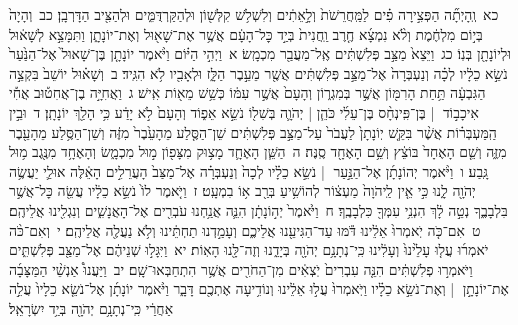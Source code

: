 \documentclass[18pt]{article}
\newcommand{\kri}[1]{\Afootnote{#1}}	%
\begin{document}
 {\loc כא~}וְֽהָיְתָ֞ה הַפְּצִ֣ירָה פִ֗ים לַמַּֽחֲרֵשֹׁת֙ וְלָ֣אֵתִ֔ים וְלִשְׁלֹ֥שׁ קִלְּשׁ֖וֹן וּלְהַקַּרְדֻּמִּ֑ים וּלְהַצִּ֖יב הַדָּרְבָֽן׃ \startlock
 {\loc כב~}וְהָיָה֙ בְּי֣וֹם מִלְחֶ֔מֶת וְלֹ֨א נִמְצָ֜א חֶ֤רֶב וַֽחֲנִית֙ בְּיַ֣ד כׇּל־הָעָ֔ם אֲשֶׁ֥ר אֶת־שָׁא֖וּל וְאֶת־יוֹנָתָ֑ן וַתִּמָּצֵ֣א לְשָׁא֔וּל וּלְיוֹנָתָ֖ן בְּנֽוֹ׃ \startlock
 {\loc כג~}וַיֵּצֵא֙ מַצַּ֣ב פְּלִשְׁתִּ֔ים אֶֽל־מַעֲבַ֖ר מִכְמָֽשׂ׃ 
\startlock
 {\loc א~}וַיְהִ֣י הַיּ֗וֹם וַיֹּ֨אמֶר יוֹנָתָ֤ן בֶּן־שָׁאוּל֙ אֶל־הַנַּ֙עַר֙ נֹשֵׂ֣א כֵלָ֔יו לְכָ֗ה וְנַעְבְּרָה֙ אֶל־מַצַּ֣ב פְּלִשְׁתִּ֔ים אֲשֶׁ֖ר מֵעֵ֣בֶר הַלָּ֑ז וּלְאָבִ֖יו לֹ֥א הִגִּֽיד׃ \startlock
 {\loc ב~}וְשָׁא֗וּל יוֹשֵׁב֙ בִּקְצֵ֣ה הַגִּבְעָ֔ה תַּ֥חַת הָרִמּ֖וֹן אֲשֶׁ֣ר בְּמִגְר֑וֹן וְהָעָם֙ אֲשֶׁ֣ר עִמּ֔וֹ כְּשֵׁ֥שׁ מֵא֖וֹת אִֽישׁ׃ \startlock
 {\loc ג~}וַאֲחִיָּ֣ה בֶן־אֲחִט֡וּב אֲחִ֡י אִיכָב֣וֹד  |  בֶּן־פִּֽינְחָ֨ס בֶּן־עֵלִ֜י כֹּהֵ֧ן  |  יְהֹוָ֛ה בְּשִׁל֖וֹ נֹשֵׂ֣א אֵפ֑וֹד וְהָעָם֙ לֹ֣א יָדַ֔ע כִּ֥י הָלַ֖ךְ יוֹנָתָֽן׃ \startlock
 {\loc ד~}וּבֵ֣ין הַֽמַּעְבְּר֗וֹת אֲשֶׁ֨ר בִּקֵּ֤שׁ יֽוֹנָתָן֙ לַעֲבֹר֙ עַל־מַצַּ֣ב פְּלִשְׁתִּ֔ים שֵׁן־הַסֶּ֤לַע מֵהָעֵ֙בֶר֙ מִזֶּ֔ה וְשֵׁן־הַסֶּ֥לַע מֵהָעֵ֖בֶר מִזֶּ֑ה וְשֵׁ֤ם הָאֶחָד֙ בּוֹצֵ֔ץ וְשֵׁ֥ם הָאֶחָ֖ד סֶֽנֶּה׃ \startlock
 {\loc ה~}הַשֵּׁ֧ן הָאֶחָ֛ד מָצ֥וּק מִצָּפ֖וֹן מ֣וּל מִכְמָ֑שׂ וְהָאֶחָ֥ד מִנֶּ֖גֶב מ֥וּל גָּֽבַע׃ \startlock
 {\loc ו~}וַיֹּ֨אמֶר יְהוֹנָתָ֜ן אֶל־הַנַּ֣עַר  |  נֹשֵׂ֣א כֵלָ֗יו לְכָה֙ וְנַעְבְּרָ֗ה אֶל־מַצַּב֙ הָעֲרֵלִ֣ים הָאֵ֔לֶּה אוּלַ֛י יַעֲשֶׂ֥ה יְהֹוָ֖ה לָ֑נוּ כִּ֣י אֵ֤ין לַֽיהֹוָה֙ מַעְצ֔וֹר לְהוֹשִׁ֥יעַ בְּרַ֖ב א֥וֹ בִמְעָֽט׃ \startlock
 {\loc ז~}וַיֹּ֤אמֶר לוֹ֙ נֹשֵׂ֣א כֵלָ֔יו עֲשֵׂ֖ה כׇּל־אֲשֶׁ֣ר בִּלְבָבֶ֑ךָ נְטֵ֣ה לָ֔ךְ הִנְנִ֥י עִמְּךָ֖ כִּלְבָבֶֽךָ׃ \startlock
 {\loc ח~}וַיֹּ֙אמֶר֙ יְה֣וֹנָתָ֔ן הִנֵּ֛ה אֲנַ֥חְנוּ עֹבְרִ֖ים אֶל־הָאֲנָשִׁ֑ים וְנִגְלִ֖ינוּ אֲלֵיהֶֽם׃ \startlock
 {\loc ט~}אִם־כֹּ֤ה יֹֽאמְרוּ֙ אֵלֵ֔ינוּ דֹּ֕מּוּ עַד־הַגִּיעֵ֖נוּ אֲלֵיכֶ֑ם וְעָמַ֣דְנוּ תַחְתֵּ֔ינוּ וְלֹ֥א נַעֲלֶ֖ה אֲלֵיהֶֽם׃ \startlock
 {\loc י~}וְאִם־כֹּ֨ה יֹאמְר֜וּ עֲל֤וּ עָלֵ֙ינוּ֙ וְעָלִ֔ינוּ כִּֽי־נְתָנָ֥ם יְהֹוָ֖ה בְּיָדֵ֑נוּ וְזֶה־לָּ֖נוּ הָאֽוֹת׃ \startlock
 {\loc יא~}וַיִּגָּל֣וּ שְׁנֵיהֶ֔ם אֶל־מַצַּ֖ב פְּלִשְׁתִּ֑ים וַיֹּאמְר֣וּ פְלִשְׁתִּ֔ים הִנֵּ֤ה עִבְרִים֙ יֹֽצְאִ֔ים מִן־הַחֹרִ֖ים אֲשֶׁ֥ר הִתְחַבְּאוּ־שָֽׁם׃ \startlock
 {\loc יב~}וַיַּעֲנוּ֩ אַנְשֵׁ֨י הַמַּצָּבָ֜ה אֶת־יוֹנָתָ֣ן  |  וְאֶת־נֹשֵׂ֣א כֵלָ֗יו וַיֹּֽאמְרוּ֙ עֲל֣וּ אֵלֵ֔ינוּ וְנוֹדִ֥יעָה אֶתְכֶ֖ם דָּבָ֑ר \edtext{{פ}
}{\kri{פסקא באמצע פסוק}שמואל א יד יב} וַיֹּ֨אמֶר יוֹנָתָ֜ן אֶל־נֹשֵׂ֤א כֵלָיו֙ עֲלֵ֣ה אַחֲרַ֔י כִּֽי־נְתָנָ֥ם יְהֹוָ֖ה בְּיַ֥ד יִשְׂרָאֵֽל׃ \startlock
\end{document}
